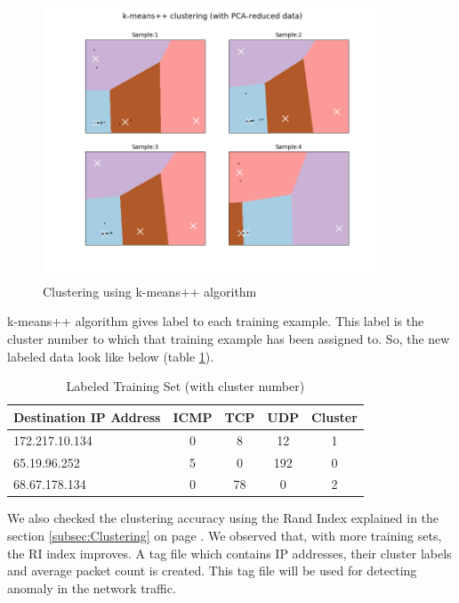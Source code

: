 \documentclass[12pt,oneside,a4paper]{article}
\begin{document}
\begin{figure}[H]
\centering
\includegraphics[width=0.90\textwidth]{kemans-clustering.png}
\caption{Clustering using k-means++ algorithm} \label{fig:k-means-clustering}
\end{figure}

k-means++ algorithm gives label to each training example. This label is the cluster number to which that training example has been assigned to. So, the new labeled data look like below (table \ref{table:labeled-set}).

\begin{table}[H]
\centering
  \begin{tabular}{| l | c | c | c | c |}
    \hline
    {Destination IP Address}  &ICMP  &TCP &UDP  &Cluster \\
    \hline
    172.217.10.134  & 0     & 8     & 12  &1  \\ \hline
    65.19.96.252    & 5     & 0     & 192 &0  \\ \hline
    68.67.178.134   & 0     & 78    & 0   &2  \\ \hline
  \end{tabular}
\caption{Labeled Training Set (with cluster number)} \label{table:labeled-set}
\end{table}

We also checked the clustering accuracy using the Rand Index explained in the section \ref{subsec:Clustering} on page \pageref{subsec:Clustering}. We observed that, with more training sets, the RI index improves. A tag file which contains IP addresses, their cluster labels and average packet count is created. This tag file will be used for detecting anomaly in the network traffic.
\end{document}
